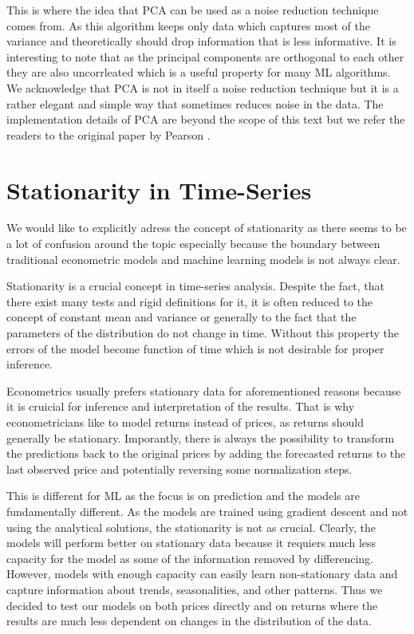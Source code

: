 This is where the idea that \ac{PCA} can be used as a noise reduction technique comes from.
As this algorithm keeps only data which captures most of the variance
and theoretically should drop information that is less informative.
It is interesting to note that as the principal components are orthogonal to each other 
they are also uncorrleated which is a useful property for many \ac{ML} algorithms. 
We acknowledge that \ac{PCA} is not in itself a noise reduction technique
but it is a rather elegant and simple way that sometimes reduces noise in the data.
The implementation details of \ac{PCA} are beyond the scope of this text but we refer the readers
to the original paper by Pearson \cite{Pearson1901}.




\section{Stationarity in Time-Series}

We would like to explicitly adress the concept of stationarity as there 
seems to be a lot of confusion around the topic especially because the boundary between 
traditional econometric models and machine learning models is not always clear.

Stationarity is a crucial concept in time-series analysis. Despite the fact, that there exist
many tests and rigid definitions for it, it is often reduced to the 
concept of constant mean and variance or generally to the fact that the parameters
of the distribution do not change in time. Without this property the errors
of the model become function of time which is not desirable for proper inference.

Econometrics usually prefers stationary data for aforementioned reasons because it 
is cruicial for inference and interpretation of the results. That is 
why econometricians like to model returns instead of prices, as returns
should generally be stationary. Imporantly, there is always the possibility
to transform the predictions back to the original prices by adding the forecasted
returns to the last observed price and potentially reversing some normalization steps.

This is different for \ac{ML} as the focus is on prediction and the models are fundamentally 
different. As the models are trained using gradient descent and not using the
analytical solutions, the stationarity is not as crucial. Clearly, 
the models will perform better on stationary data because it requiers much 
less capacity for the model as some of the information removed by differencing.
However, models with enough capacity can easily learn non-stationary data and
capture information about trends, seasonalities, and other patterns. 
Thus we decided to test our models on both prices directly and on returns where
the results are much less dependent on changes in the distribution of the data.

